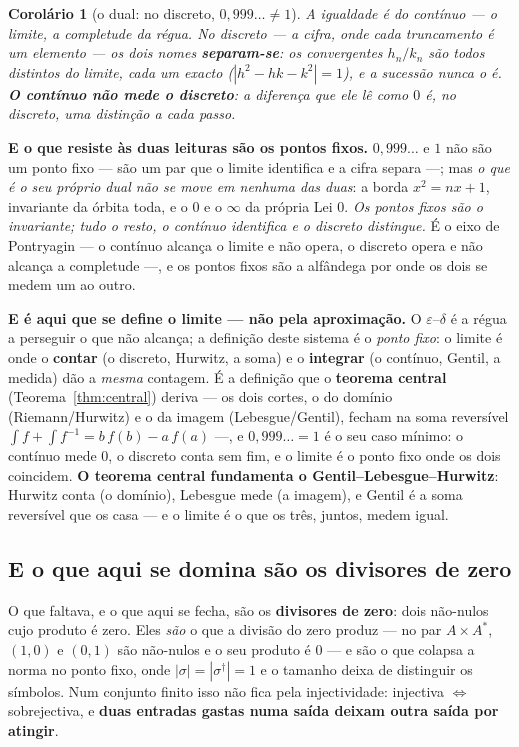 \documentclass[11pt,a4paper]{article}
\newtheorem{corolario}[teorema]{Corolário}
\newcommand{\dg}{^{\dagger}}
\begin{document}
\begin{corolario}[o dual: no discreto, $0{,}999\ldots\neq1$]\label{cor:noves-dual}
A igualdade é do \emph{contínuo} --- o limite, a completude da régua. No \emph{discreto} --- a cifra, onde
cada truncamento é um elemento --- os dois nomes \textbf{separam-se}: os convergentes $h_n/k_n$ são todos
distintos do limite, cada um exacto ($|h^2-hk-k^2|=1$), e a sucessão nunca o \emph{é}. \textbf{O contínuo
não mede o discreto}: a diferença que ele lê como $0$ é, no discreto, uma distinção a cada passo.
\end{corolario}

\noindent \textbf{E o que resiste às duas leituras são os pontos fixos.} $0{,}999\ldots$ e $1$ não são um
ponto fixo --- são um par que o limite identifica e a cifra separa ---; mas \emph{o que é o seu próprio
dual não se move em nenhuma das duas}: a borda $x^2=nx+1$, invariante da órbita toda, e o $0$ e o $\infty$
da própria Lei $0$. \emph{Os pontos fixos são o invariante; tudo o resto, o contínuo identifica e o
discreto distingue.} É o eixo de Pontryagin --- o contínuo alcança o limite e não opera, o discreto opera
e não alcança a completude ---, e os pontos fixos são a alfândega por onde os dois se medem um ao outro.

\smallskip
\noindent \textbf{E é aqui que se define o limite --- não pela aproximação.} O $\varepsilon$--$\delta$ é a
régua a perseguir o que não alcança; a definição deste sistema é o \emph{ponto fixo}: o limite é onde o
\textbf{contar} (o discreto, Hurwitz, a soma) e o \textbf{integrar} (o contínuo, Gentil, a medida) dão a
\emph{mesma} contagem. É a definição que o \textbf{teorema central} (Teorema~\ref{thm:central}) deriva ---
os dois cortes, o do domínio (Riemann/Hurwitz) e o da imagem (Lebesgue/Gentil), fecham na soma reversível
$\int f+\int f^{-1}=b\,f(b)-a\,f(a)$ ---, e $0{,}999\ldots=1$ é o seu caso mínimo: o contínuo mede $0$, o
discreto conta sem fim, e o limite é o ponto fixo onde os dois coincidem. \textbf{O teorema central
fundamenta o Gentil--Lebesgue--Hurwitz}: Hurwitz conta (o domínio), Lebesgue mede (a imagem), e Gentil é a
soma reversível que os casa --- e o limite é o que os três, juntos, medem igual.

\subsection*{E o que aqui se domina são os divisores de zero}

O que faltava, e o que aqui se fecha, são os \textbf{divisores de zero}: dois não-nulos cujo produto é
zero. Eles \emph{são} o que a divisão do zero produz --- no par $A\times A^{*}$, $(1,0)$ e $(0,1)$ são
não-nulos e o seu produto é $0$ --- e são o que colapsa a norma no ponto fixo, onde
$|\sigma|=|\sigma\dg|=1$ e o tamanho deixa de distinguir os símbolos. Num conjunto finito isso não fica
pela injectividade: injectiva $\iff$ sobrejectiva, e \textbf{duas entradas gastas numa saída deixam
outra saída por atingir}.
\end{document}
